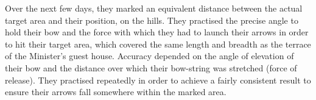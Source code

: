Over the next few days, they marked an equivalent distance between the actual
target area and their position, on the hills. They practised the precise angle
to hold their bow and the force with which they had to launch their arrows in
order to hit their target area, which covered the same length and breadth as the
terrace of the Minister's guest house. Accuracy depended on the angle of
elevation of their bow and the distance over which their bow-string was
stretched (force of release). They practised repeatedly in order to achieve a
fairly consistent result to ensure their arrows fall somewhere within the marked
area.